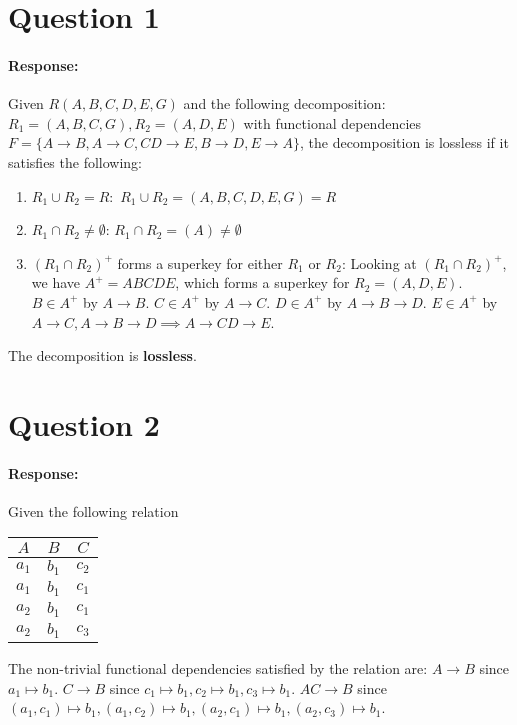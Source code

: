 \documentclass{report}
\renewcommand{\bf}[1]{\textbf{{#1}}}
\newenvironment{response}{\begin{responseframe}\vspace{-10pt}\paragraph{Response:}}{\end{responseframe}}
\begin{document}
\section*{Question 1}
\begin{response}
    Given $R(A, B, C, D, E, G)$ and the following decomposition: $R_1 = (A, B, C, G), R_2 = (A, D, E)$
    with functional dependencies $F = \{ A \to B, A \to C, CD \to E, B \to D, E \to A \}$,
    the decomposition is lossless if it satisfies the following:
    \begin{enumerate}
        \item $R_1 \cup R_2 = R:$ $R_1 \cup R_2 = (A, B, C, D, E, G) = R$ \checkmark
        \item $R_1 \cap R_2 \neq \emptyset$: $R_1 \cap R_2 = (A) \neq \emptyset$ \checkmark
        \item $(R_1 \cap R_2)^+$ forms a superkey for either $R_1$ or $R_2$:
            Looking at $(R_1 \cap R_2)^+$, we have
            $A^+ = ABCDE$, which forms a superkey for $R_2 = (A, D, E)$.
            \newline
            $B \in A^+$ by $A \to B$.
            \newline
            $C \in A^+$ by $A \to C$.
            \newline
            $D \in A^+$ by $A \to B \to D$.
            \newline
            $E \in A^+$ by $A \to C, A \to B \to D \implies A \to CD \to E$. \checkmark
    \end{enumerate}
    \noindent The decomposition is \bf{lossless}.
\end{response}

\newpage
\section*{Question 2}
\begin{response}
    Given the following relation
    \begin{center}
        \begin{tabular}{c|c|c}
            $A$ & $B$ & $C$ \\
            \hline
            $a_1$ & $b_1$ & $c_2$ \\
            $a_1$ & $b_1$ & $c_1$ \\
            $a_2$ & $b_1$ & $c_1$ \\
            $a_2$ & $b_1$ & $c_3$ \\
        \end{tabular}
    \end{center}
    \noindent The non-trivial functional dependencies satisfied by the relation are:
    \newline
    $A \to B$ since $a_1 \mapsto b_1$.
    \newline
    $C \to B$ since $c_1 \mapsto b_1, c_2 \mapsto b_1, c_3 \mapsto b_1$.
    \newline
    $AC \to B$ since $(a_1, c_1) \mapsto b_1, (a_1, c_2) \mapsto b_1, (a_2, c_1) \mapsto b_1, (a_2, c_3) \mapsto b_1$.
\end{response}
\end{document}
